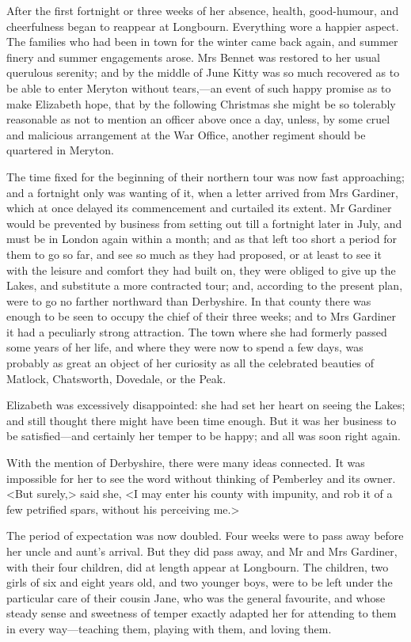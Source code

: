 After the first fortnight or three weeks of her absence, health, good-humour, and cheerfulness began to reappear at Longbourn. Everything wore a happier aspect. The families who had been in town for the winter came back again, and summer finery and summer engagements arose. Mrs Bennet was restored to her usual querulous serenity; and by the middle of June Kitty was so much recovered as to be able to enter Meryton without tears,—an event of such happy promise as to make Elizabeth hope, that by the following Christmas she might be so tolerably reasonable as not to mention an officer above once a day, unless, by some cruel and malicious arrangement at the War Office, another regiment should be quartered in Meryton.

The time fixed for the beginning of their northern tour was now fast approaching; and a fortnight only was wanting of it, when a letter arrived from Mrs Gardiner, which at once delayed its commencement and curtailed its extent. Mr Gardiner would be prevented by business from setting out till a fortnight later in July, and must be in London again within a month; and as that left too short a period for them to go so far, and see so much as they had proposed, or at least to see it with the leisure and comfort they had built on, they were obliged to give up the Lakes, and substitute a more contracted tour; and, according to the present plan, were to go no farther northward than Derbyshire. In that county there was enough to be seen to occupy the chief of their three weeks; and to Mrs Gardiner it had a peculiarly strong attraction. The town where she had formerly passed some years of her life, and where they were now to spend a few days, was probably as great an object of her curiosity as all the celebrated beauties of Matlock, Chatsworth, Dovedale, or the Peak.

Elizabeth was excessively disappointed: she had set her heart on seeing the Lakes; and still thought there might have been time enough. But it was her business to be satisfied—and certainly her temper to be happy; and all was soon right again.

With the mention of Derbyshire, there were many ideas connected. It was impossible for her to see the word without thinking of Pemberley and its owner. <But surely,> said she, <I may enter his county with impunity, and rob it of a few petrified spars, without his perceiving me.>

The period of expectation was now doubled. Four weeks were to pass away before her uncle and aunt's arrival. But they did pass away, and Mr and Mrs Gardiner, with their four children, did at length appear at Longbourn. The children, two girls of six and eight years old, and two younger boys, were to be left under the particular care of their cousin Jane, who was the general favourite, and whose steady sense and sweetness of temper exactly adapted her for attending to them in every way—teaching them, playing with them, and loving them.

